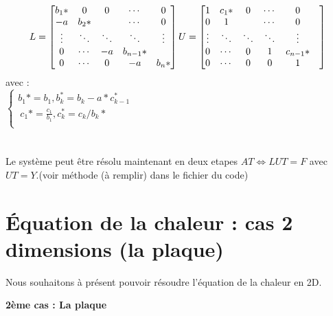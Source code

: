 \documentclass[french]{report}
\begin{document}
$$
L=
\begin{bmatrix}
   b_1* & 0 & 0& \cdots & 0\\
   -a & b_2* & & \cdots& 0\\
   \vdots & \ddots & \ddots & \ddots & \vdots \\
    0 & \cdots& -a & b_{n-1}* &  \\
    0 & \cdots & 0 & -a & b_{n}* \\
\end{bmatrix}\\
U=
\begin{bmatrix}
   1 & c_1* &0 & \cdots & 0\\
   0 & 1 & & \cdots& 0\\
   \vdots & \ddots & \ddots & \ddots & \vdots \\
    0 & \cdots& 0& 1 & c_{n-1}*& \\
    0 & \cdots & 0 & 0 & 1\\
\end{bmatrix}\\
$$ avec : \\

$\begin{cases}
b_1* =b_1  , b_k^* =b_k - a*c_{k-1}^*\\\
c_1* =\frac{c_1}{b_1}  ,  c_k^* =c_k/b_k*\\

\end{cases}$\\\\\\
Le système peut être résolu maintenant en deux etapes  $AT \Leftrightarrow   LUT=F$ avec $UT=Y$.(voir méthode (à remplir) dans le fichier du code)


\section{Équation de la chaleur  : cas 2 dimensions (la plaque)}

Nous souhaitons à présent pouvoir résoudre l’équation de la chaleur en 2D.

\textbf{2ème cas : La plaque}\\\\
\end{document}
